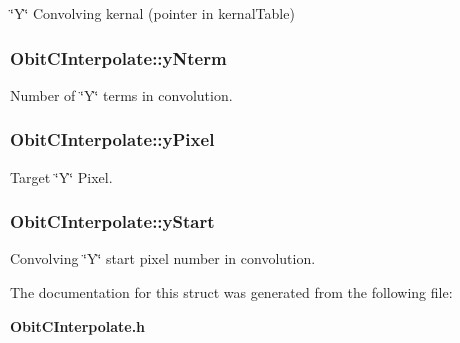 \char`\"{}Y\char`\"{} Convolving kernal (pointer in kernal\-Table) 

\subsubsection{ {\bf Obit\-CInterpolate::y\-Nterm}}\label{structObitCInterpolate_o21}


Number of \char`\"{}Y\char`\"{} terms in convolution. 

\subsubsection{ {\bf Obit\-CInterpolate::y\-Pixel}}\label{structObitCInterpolate_o17}


Target \char`\"{}Y\char`\"{} Pixel. 

\subsubsection{ {\bf Obit\-CInterpolate::y\-Start}}\label{structObitCInterpolate_o19}


Convolving \char`\"{}Y\char`\"{} start pixel number in convolution. 



The documentation for this struct was generated from the following file:\begin{CompactItemize}
\item 
{\bf Obit\-CInterpolate.h}\end{CompactItemize}
